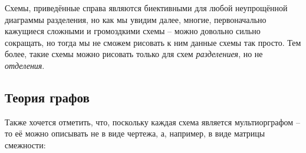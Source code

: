 \begin{minipage}{0.2\textwidth}
\end{minipage}









\vspace{0.667in}

Схемы, приведённые справа являются биективными для любой неупрощённой диаграммы разделения, но как мы увидим далее, многие, первоначально кажущиеся сложными и громоздкими схемы -- можно довольно сильно сокращать, но тогда мы не сможем рисовать к ним данные схемы так просто. Тем более, такие схемы можно рисовать только для схем \textit{разделениея}, но не \textit{отделения}.









\vspace{0.5in}

\subsection{Теория графов}

Также хочется отметить, что, поскольку каждая схема является мультиорграфом -- то её можно описывать не в виде чертежа, а, например, в виде матрицы смежности:






\newpage

